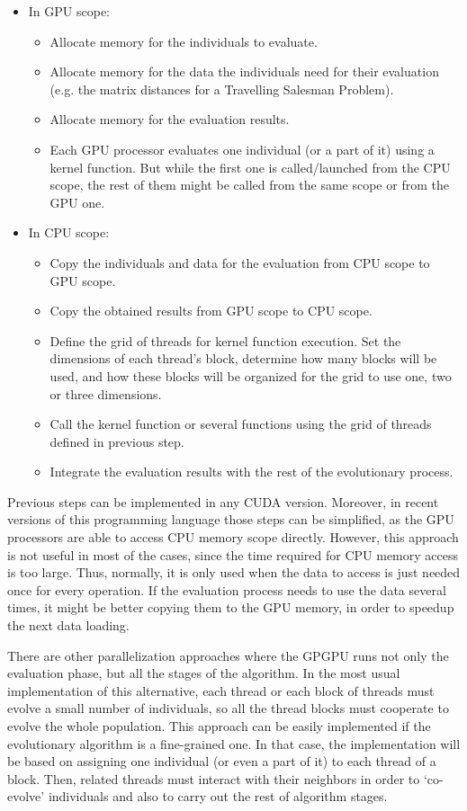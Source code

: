 \documentclass{article}
\begin{document}
\begin{itemize}
\item In GPU scope:
	\begin{itemize}
		\item Allocate memory for the individuals to evaluate.
		\item Allocate memory for the data the individuals need for their evaluation (e.g. the matrix distances for a Travelling Salesman Problem).
		\item Allocate memory for the evaluation results.
		\item Each GPU processor evaluates one individual (or a part of it) using a kernel function. But while the first one is called/launched from the CPU scope, the rest of them might be called from the same scope or from the GPU one.
	\end{itemize}
\item In CPU scope:
	\begin{itemize}
		\item Copy the individuals and data for the evaluation from CPU scope to GPU scope.
		\item Copy the obtained results from GPU scope to CPU scope.
		\item Define the grid of threads for kernel function execution. Set the dimensions of each thread's block, determine how many blocks will be used, and how these blocks will be organized for the grid to use one, two or three dimensions.
		\item Call the kernel function or several functions using the grid of threads defined in previous step.
		\item Integrate the evaluation results with the rest of the evolutionary process.
	\end{itemize}
\end{itemize}

Previous steps can be implemented in any CUDA version. Moreover, in
recent versions of this programming language those steps can be
simplified, as the GPU processors are able to access CPU memory scope
directly.
However, this approach is not useful in most of the cases, since the
time required for CPU memory access is too large. Thus, normally, it
is only used when the data to access is just needed once for every
operation. If the evaluation process needs to use the data several
times, it might be better copying them to the GPU memory, in order to
speedup the next data loading.

There are other parallelization approaches where the GPGPU runs not
only the evaluation phase, but all the stages of the algorithm.
In the most usual implementation of this alternative, each thread or each block of threads must evolve a small number of individuals, so all the thread blocks must cooperate to evolve the whole population.
This approach can be easily implemented if the evolutionary algorithm is a fine-grained one.
In that case, the implementation will be based on assigning one
individual (or even a part of it) to each thread of a block. Then,
related threads must interact with their neighbors in order to
`co-evolve' individuals and also to carry out the rest of algorithm
stages.
\end{document}
